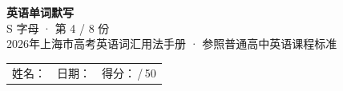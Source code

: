\documentclass[10pt,a4paper]{article}
\begin{document}
\pagestyle{plain}

\begin{center}
{\LARGE\bfseries 英语单词默写}\\[0.22em]
{\large S 字母 · 第 4 / 8 份}\\[0.18em]
{\small 2026年上海市高考英语词汇用法手册 · 参照普通高中英语课程标准}
\end{center}

\vspace{0.25em}
\noindent\begin{tabular}{@{}p{}@{}p{}@{}p{}@{}}
姓名：\underline{\hspace{2.0cm}} & 日期：\underline{\hspace{2.0cm}} & 得分：\underline{\hspace{1.3cm}}\,/\,50 \\
\end{tabular}

\vspace{0.3em}

\vspace{0.08em}
\end{document}
